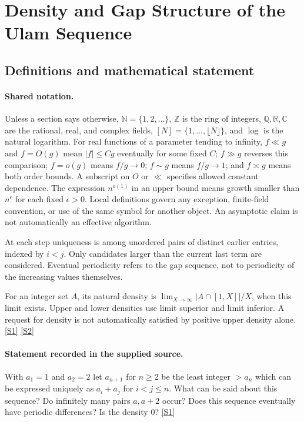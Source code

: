 \documentclass[11pt,a4paper]{article}
\newcommand{\N}{\mathbb{N}}
\newcommand{\Z}{\mathbb{Z}}
\newcommand{\Q}{\mathbb{Q}}
\newcommand{\R}{\mathbb{R}}
\newcommand{\C}{\mathbb{C}}
\newcommand{\sref}[2]{\hyperlink{source:#1:#2}{[S#2]}}
\begin{document}
\section{Density and Gap Structure of the Ulam Sequence}\label{statement}


\subsection{Definitions and mathematical statement}

\paragraph{Shared notation.}Unless a section says otherwise, $\N=\{1,2,\ldots\}$,
$\Z$ is the ring of integers, $\Q,\R,\C$ are the rational, real, and complex
fields, $[N]=\{1,\ldots,\lfloor N\rfloor\}$, and $\log$ is the natural
logarithm. For real functions of a parameter tending to infinity,
$f\ll g$ and $f=O(g)$ mean $|f|\leq Cg$ eventually for some fixed $C$;
$f\gg g$ reverses this comparison; $f=o(g)$ means $f/g\to0$;
$f\sim g$ means $f/g\to1$; and $f\asymp g$ means both order bounds.
A subscript on $O$ or $\ll$ specifies allowed constant dependence.
The expression $n^{o(1)}$ in an upper bound means growth smaller than
$n^\epsilon$ for each fixed $\epsilon>0$. Local definitions govern any
exception, finite-field convention, or use of the same symbol for another
object. An asymptotic claim is not automatically an effective algorithm.



At each step uniqueness is among unordered pairs of distinct earlier entries, indexed by $i<j$. Only candidates larger than the current last term are considered. Eventual periodicity refers to the gap sequence, not to periodicity of the increasing values themselves.

For an integer set $A$, its natural density is $\lim_{X\to\infty}|A\cap[1,X]|/X$, when this limit exists. Upper and lower densities use limit superior and limit inferior. A request for density is not automatically satisfied by positive upper density alone. \sref{statement}{1} \sref{statement}{2}

\paragraph{Statement recorded in the supplied source.}
With $a_1=1$ and $a_2=2$ let $a_{n+1}$ for $n\geq 2$ be the least integer $>a_n$ which can be expressed uniquely as $a_i+a_j$ for $i<j\leq n$.
What can be said about this sequence? Do infinitely many pairs $a,a+2$ occur? Does this sequence eventually have periodic differences? Is the density $0$? \sref{statement}{1}
\end{document}
